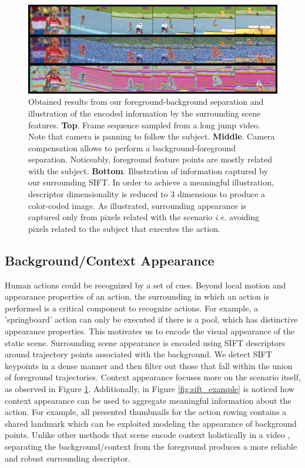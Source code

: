 \documentclass[runningheads]{llncs}
\begin{document}
\begin{figure}[t!]
\begin{center}
\includegraphics[width=0.98\linewidth]{approach.png}
\end{center}
\caption{Obtained results from our foreground-background separation and illustration of the encoded information by the surrounding scene features. \textbf{Top}. Frame sequence sampled from a long jump video. Note that camera is panning to follow the subject. \textbf{Middle}. Camera compensation allows to perform a background-foreground separation. Noticeably, foreground feature points are mostly related with the subject. \textbf{Bottom}. Illustration of information captured by our surrounding SIFT. In order to achieve a meaningful illustration, descriptor dimensionality is reduced to 3 dimensions to produce a color-coded image. As illustrated, surrounding appearance is captured only from pixels related with the scenario \emph{i.e.} avoiding pixels related to the subject that executes the action.}
\label{fig:approach}
\end{figure}


\subsection{Background/Context Appearance}
Human actions could be recognized by a set of cues. Beyond local motion and appearance properties of an action, the surrounding in which an action is performed is a critical component to recognize actions. For example, a 'springboard' action can only be executed if there is a pool, which has distinctive appearance properties. This motivates us to encode the visual appearance of the static scene. Surrounding scene appearance is encoded using SIFT descriptors \cite{lowe2004} around trajectory points associated with the background. We detect SIFT keypoints in a dense manner and then filter out those that fall within the union of foreground trajectories. Context appearance focuses more on the scenario itself, as observed in Figure \ref{fig:approach}. Additionally, in Figure \ref{fig:sift_example} is noticed how context appearance can be used to aggregate meaningful information about the action. For example, all presented thumbnails for the action rowing contains a shared landmark which can be exploited modeling the appearance of background points.  Unlike other methods that scene encode context holistically in a video \cite{marszalek2009}, separating the background/context from the foreground produces a more reliable and robust surrounding descriptor.
\end{document}
